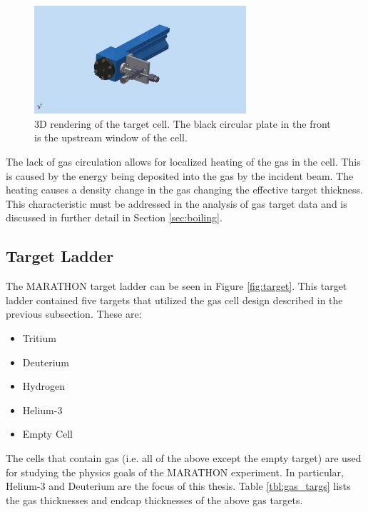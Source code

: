 \begin{figure}[h]
\begin{center}
	\includegraphics[width=0.7\textwidth]{./setup/fig/targ_cell.png}
	\caption{3D rendering of the target cell. The black circular plate in the front is the upstream window of the cell.\cite{cell_design}}
	\label{fig:3d_cell}
\end{center}
\end{figure}

The lack of gas circulation allows for localized heating of the gas in the cell. This is caused by the energy being deposited into the gas by the incident beam. The heating causes a density change in the gas changing the effective target thickness. This characteristic must be addressed in the analysis of gas target data and is discussed in further detail in Section \ref{sec:boiling}.

\subsection{Target Ladder}
The MARATHON target ladder can be seen in Figure \ref{fig:target}. This target ladder contained five targets that utilized the gas cell design described in the previous subsection. These are:
\begin{itemize}
	\item Tritium
	\item Deuterium
	\item Hydrogen
	\item Helium-3
	\item Empty Cell
\end{itemize}

The cells that contain gas (i.e. all of the above except the empty target) are used for studying the physics goals of the MARATHON experiment. In particular, Helium-3 and Deuterium are the focus of this thesis. Table \ref{tbl:gas_targs} lists the gas thicknesses and endcap thicknesses of the above gas targets.

